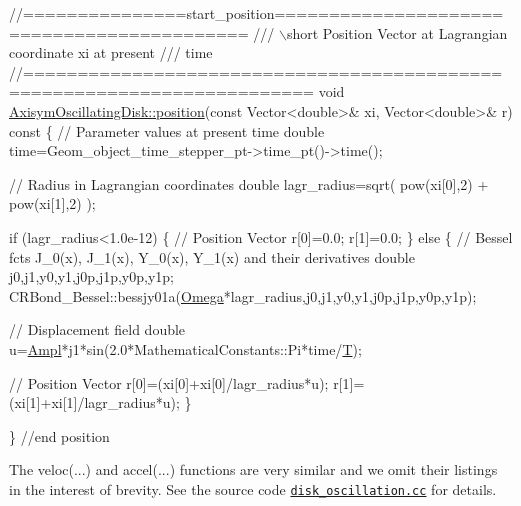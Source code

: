  
\begin{DoxyCodeInclude}
\textcolor{comment}{//===============start\_position===========================================}
\textcolor{comment}{/// \(\backslash\)short Position Vector at Lagrangian coordinate xi at present}
\textcolor{comment}{}\textcolor{comment}{/// time}
\textcolor{comment}{}\textcolor{comment}{//========================================================================}
\textcolor{keywordtype}{void} \hyperlink{classAxisymOscillatingDisk_ab63d762c8fecce8de5a2b7dc4b3b677a}{AxisymOscillatingDisk::position}(\textcolor{keyword}{const} Vector<double>& xi,
                                     Vector<double>& r)\textcolor{keyword}{ const}
\textcolor{keyword}{}\{
 \textcolor{comment}{// Parameter values at present time}
 \textcolor{keywordtype}{double} time=Geom\_object\_time\_stepper\_pt->time\_pt()->time();

 \textcolor{comment}{// Radius in Lagrangian coordinates}
 \textcolor{keywordtype}{double} lagr\_radius=sqrt( pow(xi[0],2) + pow(xi[1],2) );
 
 \textcolor{keywordflow}{if} (lagr\_radius<1.0e-12)
  \{
   \textcolor{comment}{// Position Vector}
   r[0]=0.0;
   r[1]=0.0;
  \}
 \textcolor{keywordflow}{else}
  \{
   \textcolor{comment}{// Bessel fcts J\_0(x), J\_1(x), Y\_0(x), Y\_1(x) and their derivatives}
   \textcolor{keywordtype}{double} j0,j1,y0,y1,j0p,j1p,y0p,y1p;
   CRBond\_Bessel::bessjy01a(\hyperlink{classAxisymOscillatingDisk_ab0ae3a1a7324dd0ccce15fd84471e3d1}{Omega}*lagr\_radius,j0,j1,y0,y1,j0p,j1p,y0p,y1p);
   
   \textcolor{comment}{// Displacement field }
   \textcolor{keywordtype}{double} u=\hyperlink{classAxisymOscillatingDisk_a9b73de59d11877c96bc85ad52fe7c407}{Ampl}*j1*sin(2.0*MathematicalConstants::Pi*time/\hyperlink{classAxisymOscillatingDisk_a7789dcf51ef2e2eb6e5eaa826f404da1}{T});
   
   \textcolor{comment}{// Position Vector}
   r[0]=(xi[0]+xi[0]/lagr\_radius*u);
   r[1]=(xi[1]+xi[1]/lagr\_radius*u);
  \}

\} \textcolor{comment}{//end position}

\end{DoxyCodeInclude}


The {\ttfamily veloc}(...) and {\ttfamily accel}(...) functions are very similar and we omit their listings in the interest of brevity. See the source code \href{../../../../demo_drivers/solid/disk_oscillation/disk_oscillation.cc}{\tt disk\+\_\+oscillation.\+cc} for details.



